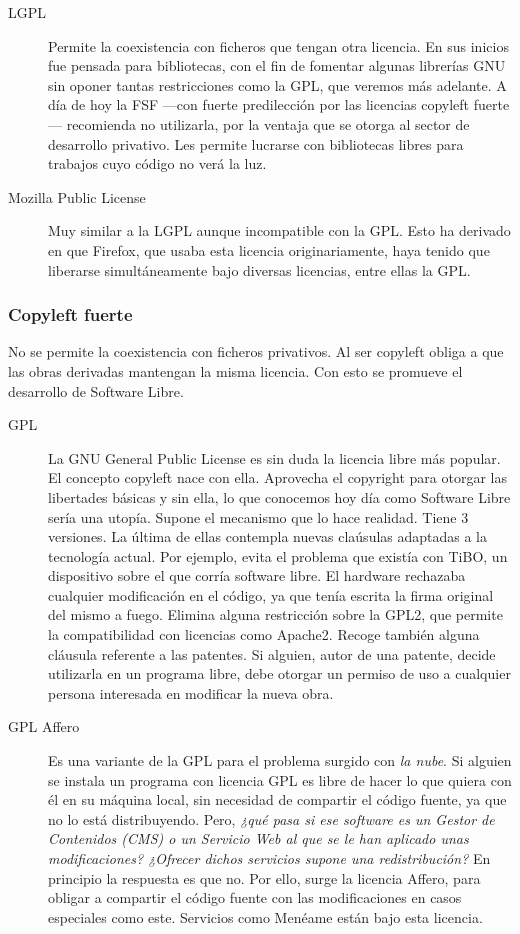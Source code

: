 \begin{description}
\item[LGPL] Permite la coexistencia con ficheros que tengan otra
  licencia. En sus inicios fue pensada para bibliotecas, con el fin de
  fomentar algunas librerías GNU sin oponer tantas restricciones como
  la GPL, que veremos más adelante. A día de hoy la FSF ---con fuerte
  predilección por las licencias copyleft fuerte--- recomienda no
  utilizarla, por la ventaja que se otorga al sector de desarrollo
  privativo. Les permite lucrarse con bibliotecas libres para trabajos
  cuyo código no verá la luz.
\item[Mozilla Public License] Muy similar a la LGPL aunque
  incompatible con la GPL. Esto ha derivado en que Firefox, que usaba
  esta licencia originariamente, haya tenido que liberarse
  simultáneamente bajo diversas licencias, entre ellas la GPL.
\end{description}

\subsubsection{Copyleft fuerte}

No se permite la coexistencia con ficheros privativos. Al ser copyleft
obliga a que las obras derivadas mantengan la misma licencia. Con esto
se promueve el desarrollo de Software Libre.

\begin{description}
\item[GPL] La GNU General Public License es sin duda la licencia libre
  más popular. El concepto copyleft nace con ella. Aprovecha el
  copyright para otorgar las libertades básicas y sin ella, lo que
  conocemos hoy día como Software Libre sería una utopía. Supone el
  mecanismo que lo hace realidad. Tiene 3 versiones. La última de
  ellas contempla nuevas claúsulas adaptadas a la tecnología
  actual. Por ejemplo, evita el problema que existía con TiBO, un
  dispositivo sobre el que corría software libre. El hardware
  rechazaba cualquier modificación en el código, ya que tenía escrita
  la firma original del mismo a fuego. Elimina alguna restricción
  sobre la GPL2, que permite la compatibilidad con licencias como
  Apache2. Recoge también alguna cláusula referente a las patentes. Si
  alguien, autor de una patente, decide utilizarla en un programa
  libre, debe otorgar un permiso de uso a cualquier persona interesada
  en modificar la nueva obra.
\item[GPL Affero] Es una variante de la GPL para el problema surgido
  con \emph{la nube}. Si alguien se instala un programa con licencia
  GPL es libre de hacer lo que quiera con él en su máquina local, sin
  necesidad de compartir el código fuente, ya que no lo está
  distribuyendo. Pero, \emph{¿qué pasa si ese software es un Gestor de
    Contenidos (CMS) o un Servicio Web al que se le han aplicado unas
    modificaciones? ¿Ofrecer dichos servicios supone una
    redistribución?}  En principio la respuesta es que no. Por ello,
  surge la licencia Affero, para obligar a compartir el código fuente
  con las modificaciones en casos especiales como este. Servicios como
  Menéame están bajo esta licencia.
\end{description}

